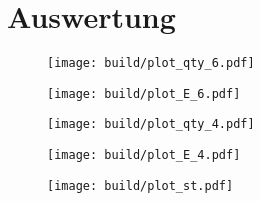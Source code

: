 \section{Auswertung}
\label{sec:auswertung}

\begin{table}
	\centering
	\caption{}
	
	\label{tab:6}
\end{table}

\begin{figure}[H]
	\texttt{[image: build/plot\_qty\_6.pdf]}
	\caption{}
	\label{fig:qty_6}
\end{figure}

\begin{figure}[H]
	\texttt{[image: build/plot\_E\_6.pdf]}
	\caption{}
	\label{fig:E_6}
\end{figure}

\begin{table}
	\centering
	\caption{}
	
	\label{tab:4}
\end{table}

\begin{figure}[H]
	\texttt{[image: build/plot\_qty\_4.pdf]}
	\caption{}
	\label{fig:qty_4}
\end{figure}

\begin{figure}[H]
	\texttt{[image: build/plot\_E\_4.pdf]}
	\caption{}
	\label{fig:E_4}
\end{figure}

\begin{table}
	\centering
	\caption{}
	
	\label{tab:st}
\end{table}

\begin{figure}[H]
	\texttt{[image: build/plot\_st.pdf]}
	\caption{}
	\label{fig:st}
\end{figure}

